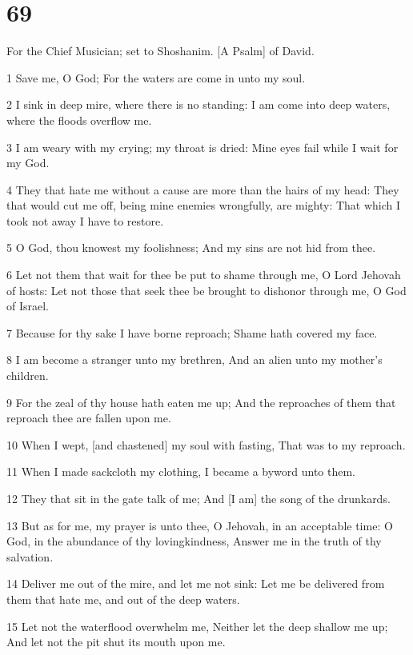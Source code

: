 \chapter{69}

\par For the Chief Musician; set to Shoshanim. [A Psalm] of David.

\par 1 Save me, O God; For the waters are come in unto my soul.
\par 2 I sink in deep mire, where there is no standing: I am come into deep waters, where the floods overflow me.
\par 3 I am weary with my crying; my throat is dried: Mine eyes fail while I wait for my God.
\par 4 They that hate me without a cause are more than the hairs of my head: They that would cut me off, being mine enemies wrongfully, are mighty: That which I took not away I have to restore.
\par 5 O God, thou knowest my foolishness; And my sins are not hid from thee.
\par 6 Let not them that wait for thee be put to shame through me, O Lord Jehovah of hosts: Let not those that seek thee be brought to dishonor through me, O God of Israel.
\par 7 Because for thy sake I have borne reproach; Shame hath covered my face.
\par 8 I am become a stranger unto my brethren, And an alien unto my mother's children.
\par 9 For the zeal of thy house hath eaten me up; And the reproaches of them that reproach thee are fallen upon me.
\par 10 When I wept, [and chastened] my soul with fasting, That was to my reproach.
\par 11 When I made sackcloth my clothing, I became a byword unto them.
\par 12 They that sit in the gate talk of me; And [I am] the song of the drunkards.
\par 13 But as for me, my prayer is unto thee, O Jehovah, in an acceptable time: O God, in the abundance of thy lovingkindness, Answer me in the truth of thy salvation.
\par 14 Deliver me out of the mire, and let me not sink: Let me be delivered from them that hate me, and out of the deep waters.
\par 15 Let not the waterflood overwhelm me, Neither let the deep shallow me up; And let not the pit shut its mouth upon me.
